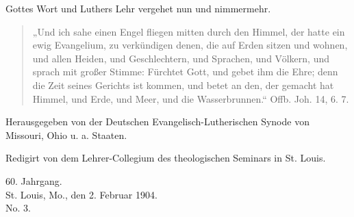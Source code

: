 \begin{titelseite}
Gottes Wort und Luthers Lehr vergehet nun und nimmermehr.

\begin{quote}
„Und ich sahe einen Engel fliegen mitten durch den Himmel, der hatte ein ewig Evangelium, zu verkündigen denen, die auf Erden sitzen und wohnen, und allen Heiden, und Geschlechtern, und Sprachen, und Völkern, und sprach mit großer Stimme: Fürchtet Gott, und gebet ihm die Ehre; denn die Zeit seines Gerichts ist kommen, und betet an den, der gemacht hat Himmel, und Erde, und Meer, und die Wasserbrunnen.“ Offb. Joh. 14, 6. 7.
\end{quote}


Herausgegeben von der Deutschen Evangelisch-Lutherischen Synode von Missouri, Ohio u. a. Staaten.

Redigirt von dem Lehrer-Collegium des theologischen Seminars in St. Louis.

60. Jahrgang. \\
St. Louis, Mo., den 2. Februar 1904. \\
No. 3.
\end{titelseite}
